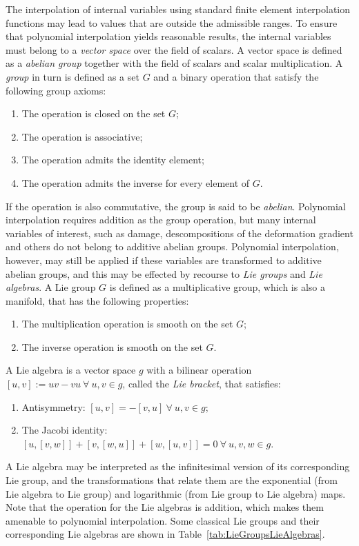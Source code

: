 \documentclass[12pt]{article}
\begin{document}
The interpolation of internal variables using standard finite element
interpolation functions may lead to values that are outside the
admissible ranges. To ensure that polynomial interpolation yields
reasonable results, the internal variables must belong to a
\emph{vector space} over the field of scalars. A vector space is
defined as a \emph{abelian group} together with the field of scalars
and scalar multiplication. A \emph{group} in turn is defined as a set
$G$ and a binary operation that satisfy the following group axioms:
\begin{enumerate}
  \item The operation is closed on the set $G$;
  \item The operation is associative;
  \item The operation admits the identity element;
  \item The operation admits the inverse for every element of $G$.
\end{enumerate}
If the operation is also commutative, the group is said to be
\emph{abelian}. Polynomial interpolation requires addition as the
group operation, but many internal variables of interest, such as
damage, descompositions of the deformation gradient and others do not
belong to additive abelian groups. Polynomial interpolation, however,
may still be applied if these variables are transformed to additive
abelian groups, and this may be effected by recourse to \emph{Lie
  groups} and \emph{Lie algebras}. A Lie group $G$ is defined as a
multiplicative group, which is also a manifold, that has the following
properties:
\begin{enumerate}
  \item The multiplication operation is smooth on the set $G$;
  \item The inverse operation is smooth on the set $G$.
\end{enumerate}
A Lie algebra is a vector space $g$ with a bilinear operation $[u,v]
:= uv - vu \: \forall \: u,v \in g$, called the \emph{Lie bracket}, that
satisfies:
\begin{enumerate}
  \item Antisymmetry: $[u,v] = - [v,u] \: \forall \: u,v \in g$;
  \item The Jacobi identity: $[u,[v,w]] + [v,[w,u]] + [w,[u,v]] = 0 \:
    \forall \: u,v,w \in g$.
\end{enumerate}
A Lie algebra may be interpreted as the infinitesimal version of its
corresponding Lie group, and the transformations that relate them are
the exponential (from Lie algebra to Lie group) and logarithmic (from
Lie group to Lie algebra) maps. Note that the operation for the Lie
algebras is addition, which makes them amenable to polynomial
interpolation. Some classical Lie groups and their corresponding Lie
algebras are shown in Table~\ref{tab:LieGroupsLieAlgebras}.
\end{document}
